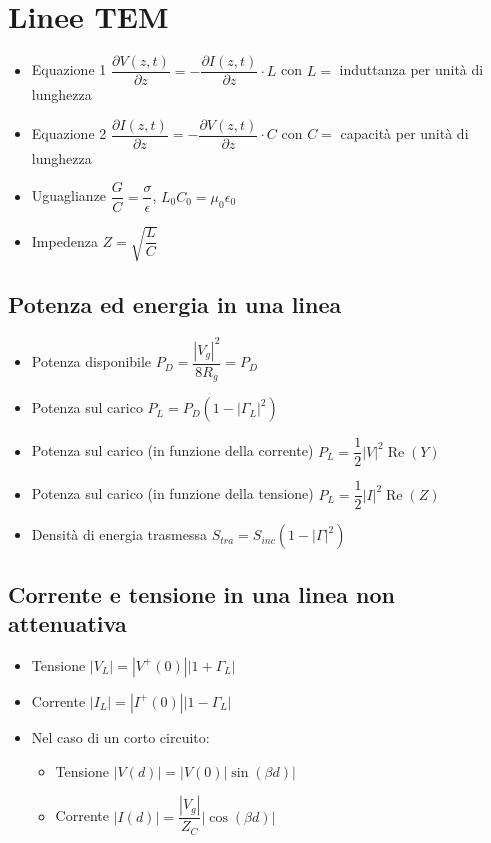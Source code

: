 \documentclass{article}
\begin{document}
\section{Linee TEM}
\begin{itemize}
	\item Equazione 1 \( \dfrac{\partial V(z, t)}{\partial z} = - \dfrac{\partial I(z, t)}{\partial z} \cdot L\) con \(L = \) induttanza per unità di lunghezza
	\item Equazione 2 \( \dfrac{\partial I(z, t)}{\partial z} = - \dfrac{\partial V(z, t)}{\partial z} \cdot C\) con \(C = \) capacità per unità di lunghezza
	\item Uguaglianze \( \dfrac{G}{C} = \dfrac{\sigma}{\epsilon} \), \(L_0 C_0 = \mu_0 \epsilon_0  \)
	\item Impedenza \( Z = \sqrt{\dfrac{L}{C}} \)
\end{itemize}

\subsection{Potenza ed energia in una linea}
\begin{itemize}
	\item Potenza disponibile \( P_D = \dfrac{|V_g|^2}{8 R_g} = P_D \)
	\item Potenza sul carico \( P_L = P_D ( 1 - | \Gamma_L | ^ 2 ) \) 
	\item Potenza sul carico (in funzione della corrente) \( P_L = \dfrac{1}{2} |V|^2  \operatorname{Re}(Y) \)
	\item Potenza sul carico (in funzione della tensione) \( P_L = \dfrac{1}{2} |I|^2  \operatorname{Re}(Z) \)
	\item Densità di energia trasmessa \( S_{tra} = S_{inc} \left( 1 - \left|\Gamma \right| ^ 2 \right) \) 
\end{itemize}

\subsection{Corrente e tensione in una linea non attenuativa}
\begin{itemize}
	\item Tensione \(|V_L| = \left| V^+(0) \right| \left|1 + \Gamma_L \right|\)
	\item Corrente \(|I_L| = \left| I^+(0) \right| \left|1 - \Gamma_L \right|\)
	\item Nel caso di un corto circuito:
	\begin{itemize}
		\item Tensione \( |V(d)| = |V(0)| \sin(\beta d) | \)
		\item Corrente \( |I(d)| = \dfrac{|V_g|}{Z_C} |\cos (\beta d) |\)
	\end{itemize}
\end{itemize}
\end{document}
